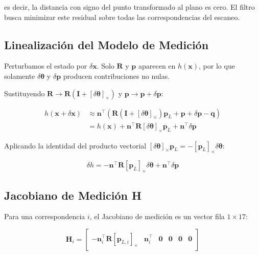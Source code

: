 es decir, la distancia con signo del punto transformado al plano es cero. El
filtro busca minimizar este residual sobre todas las correspondencias del
escaneo.

\subsection{Linealización del Modelo de Medición}
\label{sec:fej-linealizacion-medicion}

Perturbamos el estado por $\delta\mathbf{x}$. Solo $\mathbf{R}$ y $\mathbf{p}$
aparecen en $h(\mathbf{x})$, por lo que solamente $\delta\boldsymbol{\theta}$ y
$\delta\mathbf{p}$ producen contribuciones no nulas.

Sustituyendo $\mathbf{R} \to \mathbf{R}(\mathbf{I} + [\delta\boldsymbol{\theta}]_\times)$
y $\mathbf{p} \to \mathbf{p} + \delta\mathbf{p}$:

\begin{align}
h(\mathbf{x} + \delta\mathbf{x}) &\approx \mathbf{n}^\top (\mathbf{R}(\mathbf{I} + [\delta\boldsymbol{\theta}]_\times) \mathbf{p}_L + \mathbf{p} + \delta\mathbf{p} - \mathbf{q}) \nonumber \\
&= h(\mathbf{x}) + \mathbf{n}^\top \mathbf{R} [\delta\boldsymbol{\theta}]_\times \mathbf{p}_L + \mathbf{n}^\top \delta\mathbf{p}
\end{align}

Aplicando la identidad del producto vectorial
$[\delta\boldsymbol{\theta}]_\times \mathbf{p}_L = -[\mathbf{p}_L]_\times \delta\boldsymbol{\theta}$:

\begin{equation}
\delta h = -\mathbf{n}^\top \mathbf{R} [\mathbf{p}_L]_\times \delta\boldsymbol{\theta} + \mathbf{n}^\top \delta\mathbf{p}
\label{eq:dh-linearized}
\end{equation}

\subsection{Jacobiano de Medición H}
\label{sec:fej-jacobiano-h}

Para una correspondencia $i$, el Jacobiano de medición es un vector fila
$1 \times 17$:

\begin{equation}
\mathbf{H}_i =
\begin{bmatrix}
-\mathbf{n}_i^\top \mathbf{R} [\mathbf{p}_{L,i}]_\times & \mathbf{n}_i^\top & \mathbf{0} & \mathbf{0} & \mathbf{0} & \mathbf{0}
\end{bmatrix}
\label{eq:H-row}
\end{equation}

